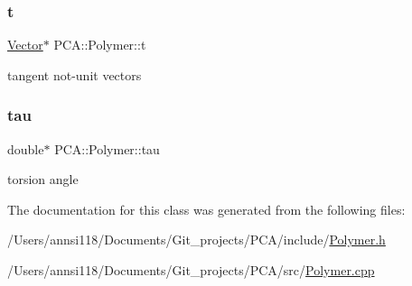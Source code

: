\subsubsection{\texorpdfstring{t}{t}}
{\footnotesize\ttfamily \hyperlink{class_p_c_a_1_1_vector}{Vector}$\ast$ P\+C\+A\+::\+Polymer\+::t\hspace{0.3cm}{\ttfamily [private]}}



tangent not-\/unit vectors 

\hypertarget{class_p_c_a_1_1_polymer_ab3b07298bdbac01a7b20b2554d7b248f}{}\label{class_p_c_a_1_1_polymer_ab3b07298bdbac01a7b20b2554d7b248f} 
\subsubsection{\texorpdfstring{tau}{tau}}
{\footnotesize\ttfamily double$\ast$ P\+C\+A\+::\+Polymer\+::tau\hspace{0.3cm}{\ttfamily [private]}}



torsion angle 



The documentation for this class was generated from the following files\+:\begin{DoxyCompactItemize}
\item 
/\+Users/annsi118/\+Documents/\+Git\+\_\+projects/\+P\+C\+A/include/\hyperlink{_polymer_8h}{Polymer.\+h}\item 
/\+Users/annsi118/\+Documents/\+Git\+\_\+projects/\+P\+C\+A/src/\hyperlink{_polymer_8cpp}{Polymer.\+cpp}\end{DoxyCompactItemize}
